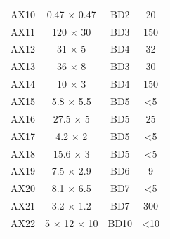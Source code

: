 \begin{table}[h!]
{\begin{tabular}{cccc}
AX10               & 0.47 $\times$ 0.47           & BD2                   & 20                                                                                                           \\ 
AX11               & 120 $\times$ 30              & BD3                   & 150                                                                                                          \\ 
AX12               & 31 $\times$ 5                & BD4                   & 32                                                                                                           \\ 
AX13               & 36 $\times$ 8                & BD3                   & 30                                                                                                           \\
AX14               & 10 $\times$ 3                & BD4                   & 150                                                                                                          \\ 
AX15               & 5.8 $\times$ 5.5             & BD5                   & \textless{}5                                                                                                 \\ 
AX16               & 27.5 $\times$ 5              & BD5                   & 25                                                                                                           \\
AX17               & 4.2 $\times$ 2               & BD5                   & \textless{}5                                                                                                 \\
AX18               & 15.6 $\times$ 3              & BD5                   & \textless{}5                                                                                                 \\ 
AX19               & 7.5 $\times$ 2.9             & BD6                   & 9                                                                                                            \\
AX20               & 8.1 $\times$ 6.5             & BD7                   & \textless{}5                                                                                                 \\
AX21               & 3.2 $\times$ 1.2             & BD7                   & 300                                                                                                          \\ 
AX22               & 5 $\times$ 12 $\times$ 10           & BD10                  & \textless{}10                                                                                                \\ \hline
\end{tabular}}
\label{tab:xenolith_dimensions}
\end{table}

